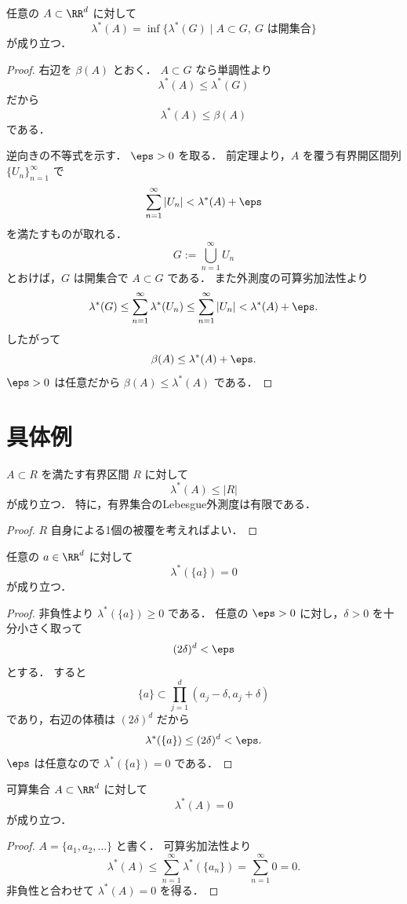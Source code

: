 \begin{corollary}[開集合による外正則性]
任意の $A \subset \RR^d$ に対して
\[
\lambda^*(A)
=
\inf\{\lambda^*(G)\mid A \subset G,\ G \text{ は開集合}\}
\]
が成り立つ．
\end{corollary}
\begin{proof}
右辺を $\beta(A)$ とおく．
$A \subset G$ なら単調性より
\[
\lambda^*(A)\le \lambda^*(G)
\]
だから
\[
\lambda^*(A)\le \beta(A)
\]
である．

逆向きの不等式を示す．
$\eps>0$ を取る．
前定理より，$A$ を覆う有界開区間列 $\{U_n\}_{n=1}^{\infty}$ で
\[
\sum_{n=1}^{\infty}|U_n|<\lambda^*(A)+\eps
\]
を満たすものが取れる．
\[
G:=\bigcup_{n=1}^{\infty}U_n
\]
とおけば，$G$ は開集合で $A \subset G$ である．
また外測度の可算劣加法性より
\[
\lambda^*(G)
\le
\sum_{n=1}^{\infty}\lambda^*(U_n)
\le
\sum_{n=1}^{\infty}|U_n|
<
\lambda^*(A)+\eps.
\]
したがって
\[
\beta(A)\le \lambda^*(A)+\eps.
\]
$\eps>0$ は任意だから $\beta(A)\le \lambda^*(A)$ である．
\end{proof}

\section{具体例}

\begin{proposition}[区間による上からの評価]
$A \subset R$ を満たす有界区間 $R$ に対して
\[
\lambda^*(A) \le |R|
\]
が成り立つ．
特に，有界集合のLebesgue外測度は有限である．
\end{proposition}
\begin{proof}
$R$ 自身による1個の被覆を考えればよい．
\end{proof}

\begin{proposition}[1点集合は零集合]
任意の $a \in \RR^d$ に対して
\[
\lambda^*(\{a\})=0
\]
が成り立つ．
\end{proposition}
\begin{proof}
非負性より $\lambda^*(\{a\}) \ge 0$ である．
任意の $\eps > 0$ に対し，$\delta > 0$ を十分小さく取って
\[
(2\delta)^d < \eps
\]
とする．
すると
\[
\{a\}
\subset
\prod_{j=1}^d (a_j-\delta,a_j+\delta)
\]
であり，右辺の体積は $(2\delta)^d$ だから
\[
\lambda^*(\{a\}) \le (2\delta)^d < \eps.
\]
$\eps$ は任意なので $\lambda^*(\{a\})=0$ である．
\end{proof}

\begin{theorem}[可算集合は零集合]
可算集合 $A \subset \RR^d$ に対して
\[
\lambda^*(A)=0
\]
が成り立つ．
\end{theorem}
\begin{proof}
$A=\{a_1,a_2,\dots\}$ と書く．
可算劣加法性より
\[
\lambda^*(A)
\le
\sum_{n=1}^{\infty} \lambda^*(\{a_n\})
=
\sum_{n=1}^{\infty} 0
=0.
\]
非負性と合わせて $\lambda^*(A)=0$ を得る．
\end{proof}

